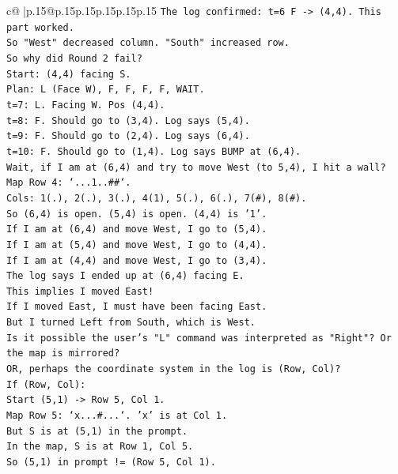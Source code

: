 \documentclass{article}
\begin{document}
{\begin{supertabular}{c@{$\;$}|p{.15\linewidth}@{}p{.15\linewidth}p{.15\linewidth}p{.15\linewidth}p{.15\linewidth}p{.15\linewidth}}
{{{\texttt{The log confirmed: t=6 F {-}> (4,4). This part worked.} \\
\texttt{So "West" decreased column. "South" increased row.} \\
\texttt{So why did Round 2 fail?} \\
\texttt{Start: (4,4) facing S.} \\
\texttt{Plan: L (Face W), F, F, F, F, WAIT.} \\
\texttt{t=7: L. Facing W. Pos (4,4).} \\
\texttt{t=8: F. Should go to (3,4). Log says (5,4).} \\
\texttt{t=9: F. Should go to (2,4). Log says (6,4).} \\
\texttt{t=10: F. Should go to (1,4). Log says BUMP at (6,4).} \\
\texttt{Wait, if I am at (6,4) and try to move West (to 5,4), I hit a wall?} \\
\texttt{Map Row 4: `...1..\#\#`.} \\
\texttt{Cols: 1(.), 2(.), 3(.), 4(1), 5(.), 6(.), 7(\#), 8(\#).} \\
\texttt{So (6,4) is open. (5,4) is open. (4,4) is '1'.} \\
\texttt{If I am at (6,4) and move West, I go to (5,4).} \\
\texttt{If I am at (5,4) and move West, I go to (4,4).} \\
\texttt{If I am at (4,4) and move West, I go to (3,4).} \\
\texttt{The log says I ended up at (6,4) facing E.} \\
\texttt{This implies I moved East!} \\
\texttt{If I moved East, I must have been facing East.} \\
\texttt{But I turned Left from South, which is West.} \\
\texttt{Is it possible the user's "L" command was interpreted as "Right"? Or the map is mirrored?} \\
\texttt{OR, perhaps the coordinate system in the log is (Row, Col)?} \\
\texttt{If (Row, Col):} \\
\texttt{Start (5,1) {-}> Row 5, Col 1.} \\
\texttt{Map Row 5: `x...\#...`. 'x' is at Col 1.} \\
\texttt{But S is at (5,1) in the prompt.} \\
\texttt{In the map, S is at Row 1, Col 5.} \\
\texttt{So (5,1) in prompt != (Row 5, Col 1).} \\
}}}
\end{supertabular}}
\end{document}
